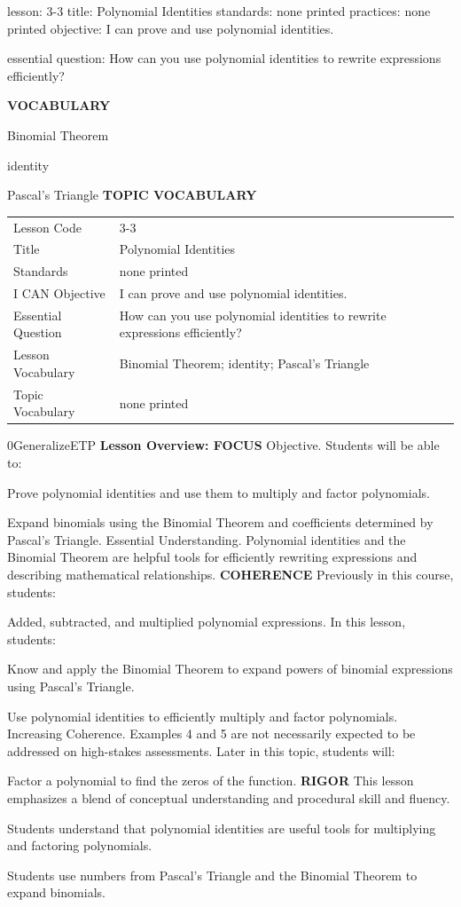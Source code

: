 \documentclass{article}
\newenvironment{lesson-meta}{}{}        %
\newenvironment{te-addendum}[2]{}{}     %
\newcommand{\te}[1]{}                   %
\begin{document}
\begin{lesson-meta}
lesson: 3-3
title: Polynomial Identities
standards: none printed
practices: none printed
objective: I can prove and use polynomial identities.

essential question: How can you use polynomial identities to rewrite expressions efficiently?

\textbf{VOCABULARY}
\item Binomial Theorem
\item identity
\item Pascal's Triangle
\textbf{TOPIC VOCABULARY}
\te{No separate topic vocabulary list is printed on these lesson pages.}
\begin{tabular}{ll}
Lesson Code & 3-3 \\
Title & Polynomial Identities \\
Standards & none printed \\
I CAN Objective & I can prove and use polynomial identities. \\
Essential Question & How can you use polynomial identities to rewrite expressions efficiently? \\
Lesson Vocabulary & Binomial Theorem; identity; Pascal's Triangle \\
Topic Vocabulary & none printed \\
\end{tabular}
\end{lesson-meta}
\begin{te-addendum}{0}{GeneralizeETP}
\textbf{Lesson Overview: FOCUS}
Objective. Students will be able to:
\item Prove polynomial identities and use them to multiply and factor polynomials.
\item Expand binomials using the Binomial Theorem and coefficients determined by Pascal's Triangle.
Essential Understanding. Polynomial identities and the Binomial Theorem are helpful tools for efficiently rewriting expressions and describing mathematical relationships.
\textbf{COHERENCE}
Previously in this course, students:
\item Added, subtracted, and multiplied polynomial expressions.
In this lesson, students:
\item Know and apply the Binomial Theorem to expand powers of binomial expressions using Pascal's Triangle.
\item Use polynomial identities to efficiently multiply and factor polynomials.
Increasing Coherence. Examples 4 and 5 are not necessarily expected to be addressed on high-stakes assessments.
Later in this topic, students will:
\item Factor a polynomial to find the zeros of the function.
\textbf{RIGOR}
This lesson emphasizes a blend of conceptual understanding and procedural skill and fluency.
\item Students understand that polynomial identities are useful tools for multiplying and factoring polynomials.
\item Students use numbers from Pascal's Triangle and the Binomial Theorem to expand binomials.
\te{Program Resources. SavvasRealize.com.}
\end{te-addendum}
\end{document}
